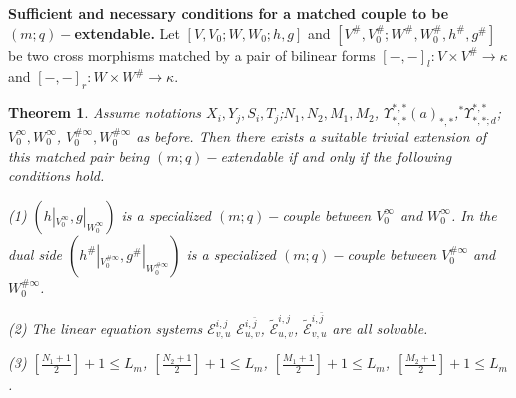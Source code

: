 \def\CTEXPreproc{Created by ctex v0.2.12, don't edit!}\documentclass[11pt]{article}
\newtheorem{thm}{Theorem}[section]
\begin{document}
 \noindent \textbf{Sufficient and necessary conditions for a matched couple to be $(m;q)-$extendable. } Let  $[V,V_0 ; W, W_0 ; h,g  ]$ and $[V^{\#} , V^{\#}_0 ; W^{\#} , W^{\#}_0 , h^{\#}, g^{\#}   ]$ be two cross  morphisms
  matched by a  pair of bilinear forms  $[-,- ]_l : V \times V^{\#}\rightarrow \kappa$ and $[-,-]_r : W \times W^{\#} \rightarrow \kappa $.

  \begin{thm} Assume notations $X_i ,Y_j ,S_i ,T_j$;$N_1 ,N_2 ,M_1 ,M_2$, $\Upsilon^{*,*}_{*,*}(a)_{*,*}    $,${}^{*}\Upsilon^{*,*}_{*,*;d}  $; $V^{\infty}_0 , W^{\infty}_0 $,
  $ V^{\# \infty}_0 ,  W^{\# \infty}_0 $ as before. Then there exists  a suitable trivial extension of this matched pair being
   $(m;q)-$extendable if and only if the following conditions hold.

\noindent(1) $( h|_{V^{\infty}_0 } , g|_{W^{\infty}_0 }   )$ is a specialized $(m;q)-$couple between $V^{\infty}_0$ and $W^{\infty}_0$.
     In the dual side $( h^{\#}|_{V^{\# \infty}_0 } , g^{\#}|_{W^{\# \infty}_0 }   )$ is a specialized $(m;q)-$couple between $V^{\# \infty}_0$ and $W^{\# \infty}_0$.

\noindent(2) The linear equation systems  $\mathscr{E}^{i,j}_{v,u}$ $\mathscr{E}^{i,\bar{j}}_{u,v}   $,  $ \tilde{\mathscr{E}}^{i,j}_{u,v} $, $ \tilde{\mathscr{E}}^{i,\bar{j}}_{v,u} $ are all solvable.

\noindent(3) $[\frac{N_1 +1}{2}] +1 \leq L_m$,  $[\frac{N_2 +1}{2}] +1 \leq L_m  $, $ [\frac{M_1 +1}{2}]+1 \leq L_m  $, $ [\frac{M_2 +1}{2}]+1 \leq L_m$.
   \end{thm}
\end{document}
